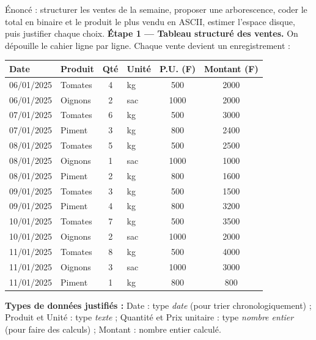 \documentclass[11pt]{article}
\begin{document}
\begin{exoresolu}
Énoncé : structurer les ventes de la semaine, proposer une arborescence, coder le total en binaire et le produit le plus vendu en ASCII, estimer l'espace disque, puis justifier chaque choix.
\tcblower
\textbf{Étape 1 — Tableau structuré des ventes.} On dépouille le cahier ligne par ligne. Chaque vente devient un enregistrement :

\begin{center}
\begin{tabular}{|l|l|c|l|c|c|}
\hline
\rowcolor{popblueL} \textbf{Date} & \textbf{Produit} & \textbf{Qté} & \textbf{Unité} & \textbf{P.U. (F)} & \textbf{Montant (F)} \\
\hline
06/01/2025 & Tomates & 4 & kg & 500 & \num{2000} \\
\hline
06/01/2025 & Oignons & 2 & sac & \num{1000} & \num{2000} \\
\hline
07/01/2025 & Tomates & 6 & kg & 500 & \num{3000} \\
\hline
07/01/2025 & Piment & 3 & kg & 800 & \num{2400} \\
\hline
08/01/2025 & Tomates & 5 & kg & 500 & \num{2500} \\
\hline
08/01/2025 & Oignons & 1 & sac & \num{1000} & \num{1000} \\
\hline
08/01/2025 & Piment & 2 & kg & 800 & \num{1600} \\
\hline
09/01/2025 & Tomates & 3 & kg & 500 & \num{1500} \\
\hline
09/01/2025 & Piment & 4 & kg & 800 & \num{3200} \\
\hline
10/01/2025 & Tomates & 7 & kg & 500 & \num{3500} \\
\hline
10/01/2025 & Oignons & 2 & sac & \num{1000} & \num{2000} \\
\hline
11/01/2025 & Tomates & 8 & kg & 500 & \num{4000} \\
\hline
11/01/2025 & Oignons & 3 & sac & \num{1000} & \num{3000} \\
\hline
11/01/2025 & Piment & 1 & kg & 800 & 800 \\
\hline
\end{tabular}
\end{center}

\textbf{Types de données justifiés :} Date : type \emph{date} (pour trier chronologiquement) ; Produit et Unité : type \emph{texte} ; Quantité et Prix unitaire : type \emph{nombre entier} (pour faire des calculs) ; Montant : nombre entier calculé.


\end{exoresolu}
\end{document}
